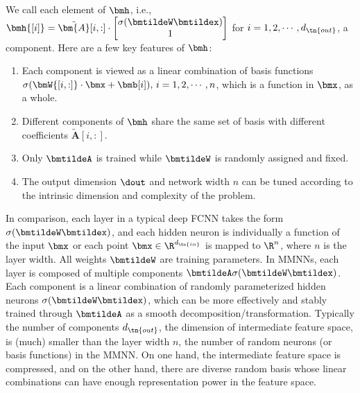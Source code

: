 \documentclass[review,hidelinks,onefignum,onetabnum]{siamart250211}
\begin{document}
We call each element of $\bmh$,  i.e., $\bmh{[i]}=\tilde{\bm{A}}{[i,:]}\cdot\left[\begin{matrix}
        \sigma(\bmtildeW\bmtildex) \\
         1
    \end{matrix}\right]$ for $i=1,2,\cdots,d_{\tn{out}}$, a component. Here are a few key features of $\bmh$:
\begin{enumerate}
    \item Each component is viewed as a linear combination of basis functions $\sigma(\bmW{[i,:]}\cdot\bmx+\bmb[i]),\, i=1,2,\cdots,n$, which is a function in $\bmx$, as a whole.
    \item Different components of $\bmh$ share the same set of basis with different coefficients $\tilde{\bm{A}}[i,:]$.
    \item Only $\bmtildeA$ is trained while $\bmtildeW$ is randomly assigned and fixed. 
    \item The output dimension $\dout$ and network width $n$ can be tuned according to the intrinsic dimension and complexity of the problem.
\end{enumerate}
In comparison, each layer in a typical deep FCNN takes the form $\sigma(\bmtildeW\bmtildex)$, and each hidden neuron is individually a function of the input $\bmx$ or each point $\bmx\in \R^{d_{\tn{in}}}$ is mapped to $\R^{n}$, where $n$ is the layer width. All weights $\bmtildeW$ are training parameters. In MMNNs, each layer is composed of multiple components $\bmtildeA\sigma(\bmtildeW\bmtildex)$. Each component is a linear combination of randomly parameterized hidden neurons $\sigma(\bmtildeW \bmtildex)$, which can be more effectively and stably trained through $\bmtildeA$ as a smooth decomposition/transformation. Typically the number of components $d_{\tn{out}}$, the dimension of intermediate feature space, is (much) smaller than the layer width $n$, the number of random neurons (or basis functions) in the MMNN. On one hand, the intermediate feature space is compressed, and on the other hand, there are diverse random basis whose linear combinations can have enough representation power in the feature space.



\end{document}
